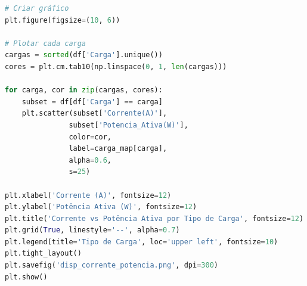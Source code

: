 \begin{apendicesenv}
\begin{lstlisting}[language=python, caption={Análise exploratória da base de dados do PZEM-004T.}, label=cod_analise_base_dados_pzem]
# Criar gráfico
plt.figure(figsize=(10, 6))

# Plotar cada carga
cargas = sorted(df['Carga'].unique())
cores = plt.cm.tab10(np.linspace(0, 1, len(cargas)))

for carga, cor in zip(cargas, cores):
    subset = df[df['Carga'] == carga]
    plt.scatter(subset['Corrente(A)'], 
               subset['Potencia_Ativa(W)'],
               color=cor, 
               label=carga_map[carga],
               alpha=0.6,
               s=25)

plt.xlabel('Corrente (A)', fontsize=12)
plt.ylabel('Potência Ativa (W)', fontsize=12)
plt.title('Corrente vs Potência Ativa por Tipo de Carga', fontsize=12)
plt.grid(True, linestyle='--', alpha=0.7)
plt.legend(title='Tipo de Carga', loc='upper left', fontsize=10)
plt.tight_layout()
plt.savefig('disp_corrente_potencia.png', dpi=300)
plt.show()

\end{lstlisting}

\end{apendicesenv}






